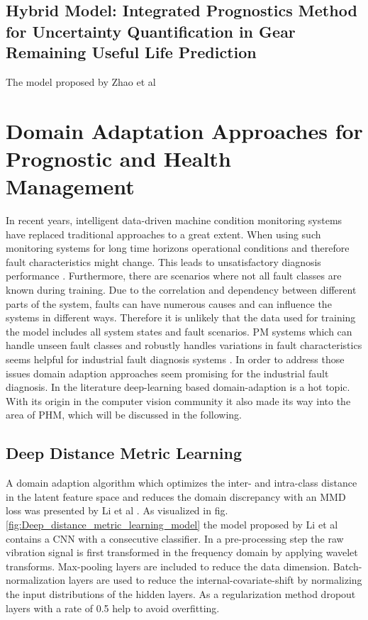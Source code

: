\subsection{Hybrid Model: Integrated Prognostics Method for Uncertainty Quantification in Gear Remaining Useful Life Prediction}

The model proposed by Zhao et al 


\section{Domain Adaptation Approaches for Prognostic and Health Management}
In recent years, intelligent data-driven machine condition monitoring systems have replaced traditional approaches to a great extent. When using such monitoring systems for long time horizons operational conditions and therefore fault characteristics might change. This leads to unsatisfactory diagnosis performance \cite{AZAMFAR2020103932}. Furthermore, there are scenarios where not all fault classes are known during training. Due to the correlation and dependency between different parts of the system, faults can have numerous causes and can influence the systems in different ways. Therefore it is unlikely that the data used for training the model includes all system states and fault scenarios. PM systems which can handle unseen fault classes and robustly handles variations in fault characteristics seems helpful for industrial fault diagnosis systems \cite{Michau2017}. In order to address those issues domain adaption approaches seem promising for the industrial fault diagnosis. In the literature deep-learning based domain-adaption is a hot topic. With its origin in the computer vision community it also made its way into the area of PHM, which will be discussed in the following. 

\subsection{Deep Distance Metric Learning}
A domain adaption algorithm which optimizes the inter- and intra-class distance in the latent feature space and reduces the domain discrepancy with an MMD loss was presented by Li et al \cite{Li2018}. As visualized in fig. \ref{fig:Deep_distance_metric_learning_model} the model proposed by Li et al contains a CNN with a consecutive classifier. In a pre-processing step the raw vibration signal is first transformed in the frequency domain by applying wavelet transforms. Max-pooling layers are included to reduce the data dimension. Batch-normalization layers are used to reduce the internal-covariate-shift by normalizing the input distributions of the hidden layers. As a regularization method dropout layers with a rate of 0.5 help to avoid overfitting. 

